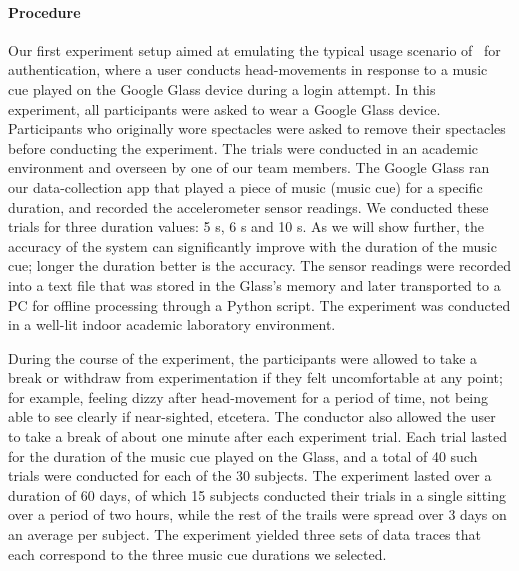 \paragraph{Procedure}
Our first experiment setup aimed at emulating the typical usage scenario 
of \systemname~for authentication, where a user conducts head-movements in 
response to a music cue played on the Google Glass device during a login 
attempt. 
In this experiment, all participants were asked to wear a Google Glass 
device. Participants who originally wore spectacles were asked to remove their
spectacles before conducting the experiment.
The trials were conducted in an academic environment and overseen by one of 
our team members.
The Google Glass ran our data-collection app that played a piece of 
music (music cue) for a specific duration, and recorded the accelerometer 
sensor readings. We conducted these trials for three duration values: 5 s, 
6 s and 10 s. As we will show further, the accuracy of the system can 
significantly improve with the duration of the music cue; longer the duration 
better is the accuracy. 
The sensor readings were recorded into a text file that was stored 
in the Glass's memory and later transported to a PC for offline processing
through a Python script. The experiment was conducted in a well-lit indoor 
academic laboratory environment. 
 
During the course of the experiment, the participants were allowed to take a 
break or withdraw from experimentation if they felt uncomfortable at any 
point; for example, feeling 
dizzy after head-movement for a period of time, not being able to see clearly 
if near-sighted, etcetera. The conductor also allowed the user to take a break 
of about one minute after each experiment trial.
Each trial lasted for the duration of the music cue played on the Glass, and 
a total of 40 such trials were conducted for each of the 30 subjects. 
The experiment lasted over a duration of 60 days, of which 15 
subjects conducted their trials in a single sitting over a period of two 
hours, while the rest of the trails were spread over 3 days on an average per 
subject.
The experiment yielded three sets of data traces that each correspond to 
the three music cue durations we selected. 

